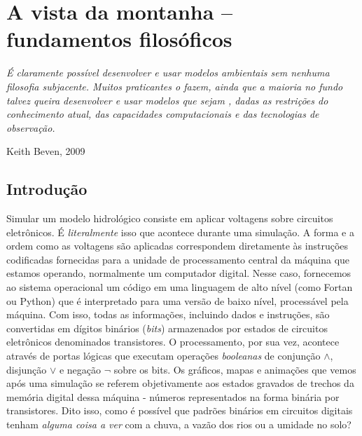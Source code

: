 \documentclass[./main.tex]{subfiles}
\begin{document}
\chapter{A vista da montanha -- fundamentos filosóficos} \label{chap:episteme}

\epigraph{\textit{É claramente possível desenvolver e usar modelos ambientais sem nenhuma filosofia subjacente. Muitos praticantes o fazem, ainda que a maioria no fundo talvez queira desenvolver e usar modelos que sejam , dadas as restrições do conhecimento atual, das capacidades computacionais e das tecnologias de observação.}}{Keith Beven, 2009}

\section{Introdução}\label{episteme:intro}

\par Simular um modelo hidrológico consiste em aplicar voltagens sobre circuitos eletrônicos. É \textit{literalmente} isso que acontece durante uma simulação. A forma e a ordem como as voltagens são aplicadas correspondem diretamente às instruções codificadas fornecidas para a unidade de processamento central da máquina que estamos operando, normalmente um computador digital. Nesse caso, fornecemos ao sistema operacional um código em uma linguagem de alto nível (como Fortan ou Python) que é interpretado para uma versão de baixo nível, processável pela máquina. Com isso, todas as informações, incluindo dados e instruções, são convertidas em dígitos binários (\textit{bits}) armazenados por estados de circuitos eletrônicos denominados transistores. O processamento, por sua vez, acontece através de portas lógicas que executam operações \textit{booleanas} de conjunção $\land$, disjunção $\lor$ e negação $\neg$ sobre os bits. Os gráficos, mapas e animações que vemos após uma simulação se referem objetivamente aos estados gravados de trechos da memória digital dessa máquina - números representados na forma binária por transistores. Dito isso, como é possível que padrões binários em circuitos digitais tenham \textit{alguma coisa a ver} com a chuva, a vazão dos rios ou a umidade no solo?
\end{document}
